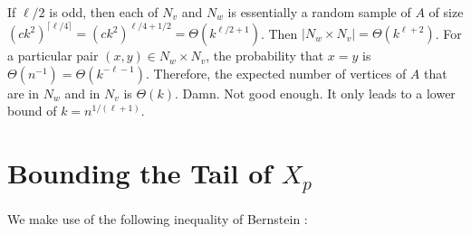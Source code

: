 \documentclass{patmorin}
\newcommand{\trn}{\chi_{\mathrm{us}}}
\begin{document}
If $\ell/2$ is odd, then each of $N_v$ and $N_w$ is essentially a random sample of $A$ of size $(ck^2)^{\lceil\ell/4\rceil}=(ck^2)^{\ell/4+1/2}=\Theta(k^{\ell/2+1})$.
Then $|N_w\times N_v|=\Theta(k^{\ell+2})$.  For a particular pair $(x,y)\in N_w\times N_v$, the probability that $x=y$ is $\Theta(n^{-1})=\Theta(k^{-\ell-1})$.  Therefore, the expected number of vertices of $A$ that are in $N_w$ and in $N_v$ is $\Theta(k)$.  Damn. Not good enough.  It only leads to a lower bound of $k=n^{1/(\ell+1)}$.














\appendix

\section{Bounding the Tail of \boldmath $X_p$}

We make use of the following inequality of Bernstein \cite[Corollary~2.11]{boucheron.lugosi.ea:concentration}:
\end{document}
